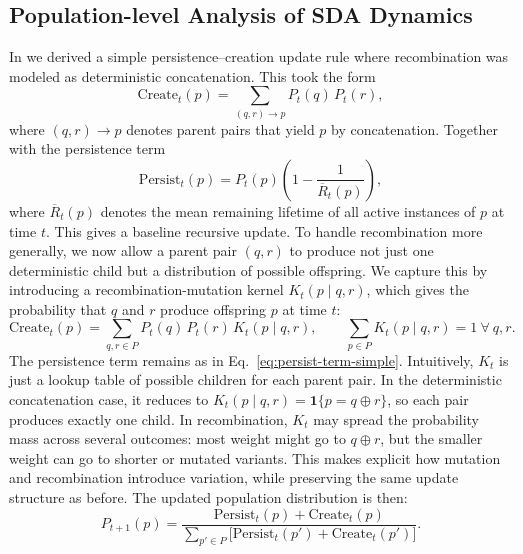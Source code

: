 \documentclass{artificial-life}
\let\cite\citep
\begin{document}
\subsection{Population-level Analysis of SDA Dynamics}

In \cite{adler_sda} we derived a simple persistence–creation update rule where 
recombination was modeled as deterministic concatenation. This took the form
\begin{equation}
\label{eq:create-term-simple}
\mathrm{Create}_t(p) = \sum_{(q,r)\to p} P_t(q)\,P_t(r),
\end{equation}
where $(q,r)\to p$ denotes parent pairs that yield $p$ by concatenation. 
Together with the persistence term
\begin{equation}
\label{eq:persist-term-simple}
\mathrm{Persist}_t(p) = P_t(p)\left(1-\frac{1}{\overline{R}_t(p)}\right),
\end{equation}
where $\overline{R}_t(p)$ denotes the mean remaining lifetime of all active
instances of $p$ at time $t$. This gives a baseline recursive update. To handle recombination more generally, we now allow a parent pair $(q,r)$ 
to produce not just one deterministic child but a distribution of possible
offspring. We capture this by introducing a recombination-mutation kernel
$K_t(p\mid q,r)$, which gives the probability that $q$ and $r$ produce
offspring $p$ at time $t$:
\begin{equation}
\label{eq:create-term-kernel}
\mathrm{Create}_t(p) = \sum_{q,r\in P} P_t(q)\,P_t(r)\,K_t(p\mid q,r),
\qquad \sum_{p\in P} K_t(p\mid q,r)=1~\forall~q,r.
\end{equation}
The persistence term remains as in Eq.~\ref{eq:persist-term-simple}. Intuitively, $K_t$ is just a lookup table of possible children for each 
parent pair. In the deterministic concatenation case, it reduces to 
$K_t(p\mid q,r)=\mathbf{1}\{p=q\oplus r\}$, so each pair produces exactly 
one child. In recombination, $K_t$ may spread the probability mass across 
several outcomes: most weight might go to $q\oplus r$, but the smaller weight 
can go to shorter or mutated variants. This makes explicit how mutation 
and recombination introduce variation, while preserving the same update 
structure as before. The updated population distribution is then:
\begin{equation}
\label{eq:full-ba-update}
P_{t+1}(p) = \frac{\mathrm{Persist}_t(p) + \mathrm{Create}_t(p)}
{\sum_{p' \in P} \big[\mathrm{Persist}_t(p') + \mathrm{Create}_t(p')\big]}.
\end{equation}
\end{document}

